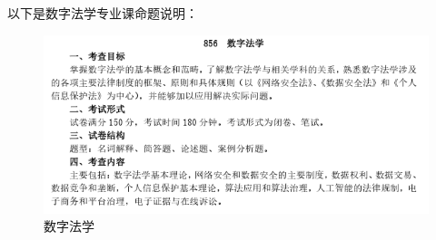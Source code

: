 \documentclass[12pt, a4paper, oneside]{ctexart}
\begin{document}
以下是数字法学专业课命题说明：
\begin{figure}[H] %
    \centering %
    \includegraphics[width=\textwidth]{law} %
    \caption{数字法学} %
    \label{1}
\end{figure}

\end{document}
